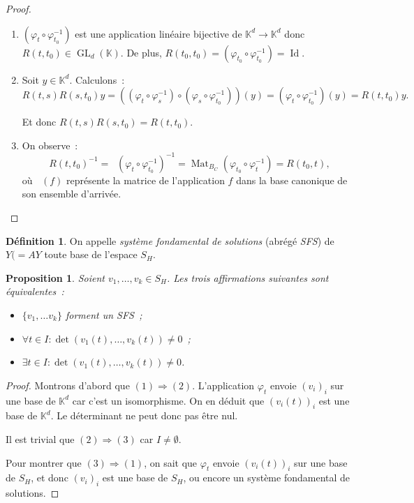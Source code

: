 \documentclass{report}
\newtheorem{prp}[thm]{Proposition}
\theoremstyle{definition}
\newtheorem{déf}[thm]{Définition}
\theoremstyle{remark}
\numberwithin{equation}{section}
\newcommand{\K}{\mathbb K}
\DeclareMathOperator{\Mat}{Mat}
\DeclareMathOperator{\MatBC}{\Mat_{B_C}}
\DeclareMathOperator{\GL}{GL}
\DeclareMathOperator{\Id}{Id}
\begin{document}
		\begin{proof}~
		\begin{enumerate}
			\item $(\varphi_t \circ \varphi_{t_0}^{-1})$ est une application linéaire bijective de $\K^d \to \K^d$ donc $R(t, t_0) \in \GL_d(\K)$.
			De plus, $R(t_0, t_0) = (\varphi_{t_0} \circ \varphi_{t_0}^{-1}) = \Id$.
			\item Soit $y \in \K^d$. Calculons~:
			\begin{equation}
				R(t, s)R(s, t_0)y = \left(\left(\varphi_t \circ \varphi_s^{-1}\right) \circ \left(\varphi_s \circ \varphi_{t_0}^{-1}\right)\right)(y)
				= \left(\varphi_t \circ \varphi_{t_0}^{-1}\right)(y) = R(t, t_0)y.
			\end{equation}

			Et donc $R(t, s)R(s, t_0) = R(t, t_0)$.

			\item On observe~:
			\begin{equation}
				R(t, t_0)^{-1} = \MatBC\left(\varphi_t \circ \varphi_{t_0}^{-1}\right)^{-1} = \Mat_{B_C}\left(\varphi_{t_0} \circ \varphi_t^{-1}\right) = R(t_0, t),
			\end{equation}
			où $\MatBC(f)$ représente la matrice de l'application $f$ dans la base canonique de son ensemble d'arrivée.
		\end{enumerate}
		\end{proof}

		\begin{déf} On appelle \textit{système fondamental de solutions} (abrégé \textit{SFS}) de $Y( = AY$ toute base de l'espace $S_H$.
		\end{déf}

		\begin{prp} Soient $v_1, \ldots, v_k \in S_H$. Les trois affirmations suivantes sont équivalentes~:
		\begin{itemize}
			\item $\{v_1, \ldots v_k\}$ forment un SFS~;
			\item $\forall t \in I : \det(v_1(t), \ldots, v_k(t)) \neq 0$~;
			\item $\exists t \in I : \det(v_1(t), \ldots, v_k(t)) \neq 0$.
		\end{itemize}
		\end{prp}

		\begin{proof} Montrons d'abord que $(1) \Rightarrow (2)$. L'application $\varphi_t$ envoie $(v_i)_i$ sur une base de $\K^d$ car c'est un isomorphisme.
		On en déduit que $(v_i(t))_i$ est une base de $\K^d$. Le déterminant ne peut donc pas être nul.

		Il est trivial que $(2) \Rightarrow (3)$ car $I \neq \emptyset$.

		Pour montrer que $(3) \Rightarrow (1)$, on sait que $\varphi_t$ envoie $(v_i(t))_i$ sur une base de $S_H$, et donc $(v_i)_i$ est une base de $S_H$, ou
		encore un système fondamental de solutions.
		\end{proof}
\end{document}

